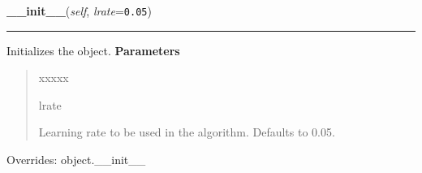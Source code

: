 \hspace{.8\funcindent}\begin{boxedminipage}{\funcwidth}

    \raggedright \textbf{\_\_init\_\_}(\textit{self}, \textit{lrate}={\tt 0.05})

    \vspace{-1.5ex}

    \rule{\textwidth}{0.5\fboxrule}
\setlength{\parskip}{2ex}

Initializes the object.
\setlength{\parskip}{1ex}
      \textbf{Parameters}
      \vspace{-1ex}

      \begin{quote}
        \begin{Ventry}{xxxxx}

          \item[lrate]


Learning rate to be used in the algorithm. Defaults to 0.05.
        \end{Ventry}

      \end{quote}

      Overrides: object.\_\_init\_\_

    \end{boxedminipage}

    \vspace{0.5ex}

